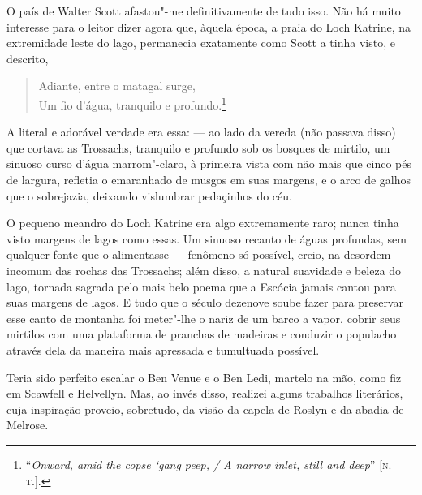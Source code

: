 O país de Walter Scott afastou"-me definitivamente de tudo isso. Não há
muito interesse para o leitor dizer agora que, àquela época, a praia do
Loch Katrine, na extremidade leste do lago, permanecia exatamente como
Scott a tinha visto, e descrito,

\begin{verse}
Adiante, entre o matagal surge,\\
Um fio d'água, tranquilo e profundo.\footnote{``\emph{Onward, amid the copse `gang peep, / A narrow inlet, still and deep}'' {[}\textsc{n.\,t.}{]}.}
\end{verse}  

A literal e adorável verdade era essa: --- ao lado da vereda (não passava
disso) que cortava as Trossachs, tranquilo e profundo sob os bosques de
mirtilo, um sinuoso curso d'água marrom"-claro, à primeira vista com não
mais que cinco pés de largura, refletia o emaranhado de musgos em suas
margens, e o arco de galhos que o sobrejazia, deixando vislumbrar
pedaçinhos do céu.

O pequeno meandro do Loch Katrine era algo extremamente raro; nunca
tinha visto margens de lagos como essas. Um sinuoso recanto de águas
profundas, sem qualquer fonte que o alimentasse --- fenômeno só possível,
creio, na desordem incomum das rochas das Trossachs; além disso, a
natural suavidade e beleza do lago, tornada sagrada pelo mais belo poema
que a Escócia jamais cantou para suas margens de lagos. E tudo que o
século dezenove soube fazer para preservar esse canto de montanha foi
meter"-lhe o nariz de um barco a vapor, cobrir seus mirtilos com uma
plataforma de pranchas de madeiras e conduzir o populacho através dela
da maneira mais apressada e tumultuada possível.

Teria sido perfeito escalar o Ben Venue e o Ben Ledi, martelo na mão,
como fiz em Scawfell e Helvellyn. Mas, ao invés disso, realizei alguns
trabalhos literários, cuja inspiração proveio, sobretudo, da visão da
capela de Roslyn e da abadia de Melrose.

